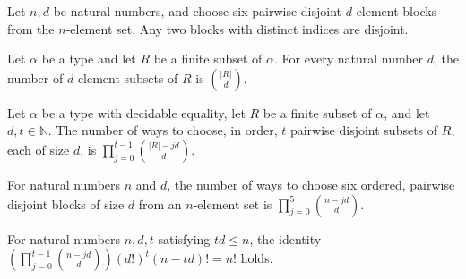 \begin{theorem}
\label{FABL.SixDisjointBlockChoice.block_pairwiseDisjoint}
\leanok
{}
Let $n,d$ be natural numbers, and choose six pairwise disjoint $d$-element blocks from
the $n$-element set. Any two blocks with distinct indices are disjoint.
\end{theorem}

\begin{theorem}
\label{FABL.natCard_powersetCardSubtype}
\leanok
{}
Let $\alpha$ be a type and let $R$ be a finite subset of $\alpha$. For every natural
number $d$, the number of $d$-element subsets of $R$ is $\binom{|R|}{d}$.
\end{theorem}

\begin{theorem}
\label{FABL.natCard_disjointBlockChoices}
\leanok
{}
Let $\alpha$ be a type with decidable equality, let $R$ be a finite subset of $\alpha$,
and let $d,t\in\mathbb N$. The number of ways to choose, in order, $t$ pairwise disjoint
subsets of $R$, each of size $d$, is $\displaystyle\prod_{j=0}^{t-1}\binom{|R|-jd}{d}$.
\end{theorem}

\begin{theorem}
\label{FABL.natCard_sixDisjointBlockChoice}
\leanok
{}
For natural numbers $n$ and $d$, the number of ways to choose six ordered, pairwise
disjoint blocks of size $d$ from an $n$-element set is $\prod_{j=0}^{5}\binom{n-jd}{d}$.
\end{theorem}

\begin{theorem}
\label{FABL.prod_choose_sub_mul_factorials}
\leanok
{}
For natural numbers $n,d,t$ satisfying $td\le n$, the identity
$\left(\prod_{j=0}^{t-1}\binom{n-jd}{d}\right)(d!)^t(n-td)!=n!$ holds.
\end{theorem}

